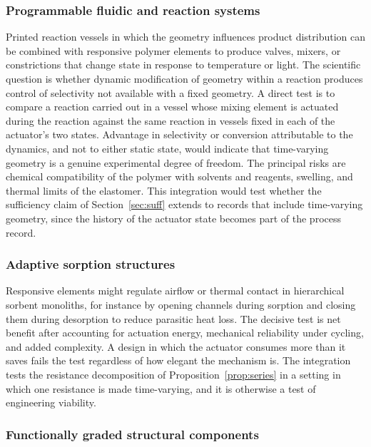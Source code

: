 \documentclass[11pt]{article}
\theoremstyle{definition}
\begin{document}
\subsubsection*{Programmable fluidic and reaction systems}

Printed reaction vessels in which the geometry influences product distribution \cite{symes2012} can be combined with responsive polymer elements \cite{vanoosten2009,lee2026} to produce valves, mixers, or constrictions that change state in response to temperature or light. The scientific question is whether dynamic modification of geometry within a reaction produces control of selectivity not available with a fixed geometry. A direct test is to compare a reaction carried out in a vessel whose mixing element is actuated during the reaction against the same reaction in vessels fixed in each of the actuator's two states. Advantage in selectivity or conversion attributable to the dynamics, and not to either static state, would indicate that time-varying geometry is a genuine experimental degree of freedom. The principal risks are chemical compatibility of the polymer with solvents and reagents, swelling, and thermal limits of the elastomer. This integration would test whether the sufficiency claim of Section~\ref{sec:suff} extends to records that include time-varying geometry, since the history of the actuator state becomes part of the process record.

\subsubsection*{Adaptive sorption structures}

Responsive elements might regulate airflow or thermal contact in hierarchical sorbent monoliths, for instance by opening channels during sorption and closing them during desorption to reduce parasitic heat loss. The decisive test is net benefit after accounting for actuation energy, mechanical reliability under cycling, and added complexity. A design in which the actuator consumes more than it saves fails the test regardless of how elegant the mechanism is. The integration tests the resistance decomposition of Proposition~\ref{prop:series} in a setting in which one resistance is made time-varying, and it is otherwise a test of engineering viability.

\subsubsection*{Functionally graded structural components}
\end{document}
